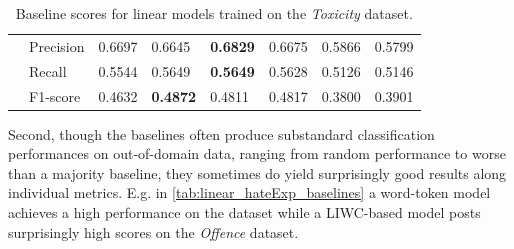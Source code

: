 \begin{table}[]
\begin{minipage}{0.42\paperheight}
{\begin{tabular}{ll|ll|ll|ll}
                                        & Precision & 0.6697 & 0.6645            & \bf{0.6829} & 0.6675      & 0.5866 & 0.5799          \\
                                        & Recall    & 0.5544 & 0.5649            & \bf{0.5649} & 0.5628      & 0.5126 & 0.5146          \\
                                        & F1-score  & 0.4632 & \bf{0.4872}       & 0.4811      & 0.4817      & 0.3800 & 0.3901
    \end{tabular}%
    }
    \caption{Baseline scores for linear models trained on the \textit{Toxicity} dataset.}
    \label{tab:linear_toxicity_baselines}
    \end{minipage}
\end{table}

Second, though the baselines often produce substandard classification performances on out-of-domain data, ranging from random performance to worse than a majority baseline, they sometimes do yield surprisingly good results along individual metrics. E.g. in \cref{tab:linear_hateExp_baselines} a word-token model achieves a high performance on the \citet{Toxicity} dataset while a LIWC-based model posts surprisingly high scores on the \textit{Offence} dataset.

